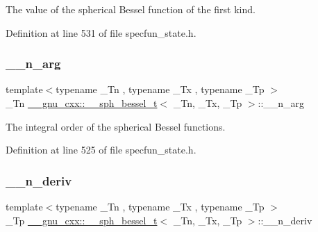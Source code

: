 The value of the spherical Bessel function of the first kind. 



Definition at line 531 of file specfun\+\_\+state.\+h.

\mbox{\label{struct____gnu__cxx_1_1____sph__bessel__t_a002325ca0f884fb872e1d211e7885d58}} 
\subsubsection{\texorpdfstring{\+\_\+\+\_\+n\+\_\+arg}{\_\_n\_arg}}
{\footnotesize\ttfamily template$<$typename \+\_\+\+Tn , typename \+\_\+\+Tx , typename \+\_\+\+Tp $>$ \\
\+\_\+\+Tn \hyperlink{struct____gnu__cxx_1_1____sph__bessel__t}{\+\_\+\+\_\+gnu\+\_\+cxx\+::\+\_\+\+\_\+sph\+\_\+bessel\+\_\+t}$<$ \+\_\+\+Tn, \+\_\+\+Tx, \+\_\+\+Tp $>$\+::\+\_\+\+\_\+n\+\_\+arg}



The integral order of the spherical Bessel functions. 



Definition at line 525 of file specfun\+\_\+state.\+h.

\mbox{\label{struct____gnu__cxx_1_1____sph__bessel__t_a84247b0cc2295f300c523d85a3cc601f}} 
\subsubsection{\texorpdfstring{\+\_\+\+\_\+n\+\_\+deriv}{\_\_n\_deriv}}
{\footnotesize\ttfamily template$<$typename \+\_\+\+Tn , typename \+\_\+\+Tx , typename \+\_\+\+Tp $>$ \\
\+\_\+\+Tp \hyperlink{struct____gnu__cxx_1_1____sph__bessel__t}{\+\_\+\+\_\+gnu\+\_\+cxx\+::\+\_\+\+\_\+sph\+\_\+bessel\+\_\+t}$<$ \+\_\+\+Tn, \+\_\+\+Tx, \+\_\+\+Tp $>$\+::\+\_\+\+\_\+n\+\_\+deriv}



